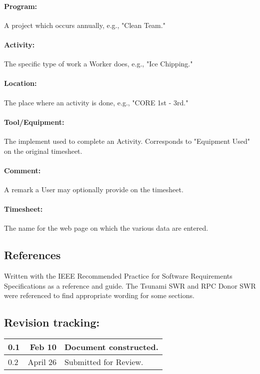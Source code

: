 \documentclass[12pt]{article}
\begin{document}
\paragraph{Program:} A project which occurs annually, e.g., "Clean Team."
\paragraph{Activity:} The specific type of work a Worker does, e.g., "Ice Chipping."
\paragraph{Location:} The place where an activity is done, e.g., "CORE 1st - 3rd."
\paragraph{Tool/Equipment:} The implement used to complete an Activity. Corresponds to "Equipment Used" on the original timesheet.
\paragraph{Comment:} A remark a User may optionally provide on the timesheet.
\paragraph{Timesheet:} The name for the web page on which the various data are entered.


\subsection{References}
Written with the IEEE Recommended Practice for Software Requirements Specifications as a reference and guide. The Tsunami SWR and RPC Donor SWR were referenced to find appropriate wording for some sections.

\subsection{Revision tracking:}
\begin{tabular}{|l|r|p{5in}|}
\hline
0.1 & Feb 10 & Document constructed.\\
\hline
0.2 & April 26 & Submitted for Review.\\
\hline
\end{tabular}
\end{document}
